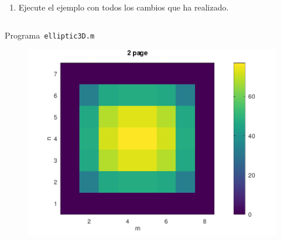 \begin{problem}
\begin{enumerate}
            \begin{solution}
                  \noQED
            \end{solution}

      \item

            Ejecute el ejemplo con todos los cambios que ha realizado.

            \begin{solution}
                  \noQED
            \end{solution}
\end{enumerate}
\end{problem}

\begin{listing}[ht!]
      \tiny
      \centering
      \inputminted[frame=single,framesep=10pt,linenos,firstline=1,lastline=38,highlightlines={14,15}]{octave}{../examples/octave/elliptic3D.m}
      \caption{Programa~\texttt{elliptic3D.m}}
      \label{code:elliptic3D.m}
\end{listing}

\begin{figure}[ht!]
      \centering
      \includegraphics[width=.6\paperwidth]{../examples/octave/elliptic3D.pdf}
\end{figure}
